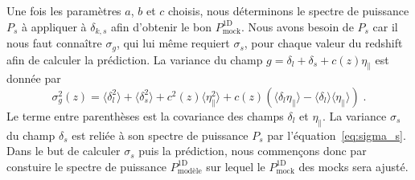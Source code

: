 Une fois les paramètres $a$, $b$ et $c$ choisis, nous déterminons le spectre de puissance $P_{s}$ à appliquer à $\delta_{k,s}$ afin d'obtenir le bon $P_{\mathrm{mock}}^{\mathrm{1D}}$.
Nous avons besoin de $P_{s}$ car il nous faut connaître $\sigma_g$, qui lui même requiert $\sigma_s$, pour chaque valeur du redshift afin de calculer la prédiction.
La variance du champ $g = \delta_l + \delta_s + c(z)\eta_{\parallel}$ est donnée par
\begin{equation}
  \label{eq:sigma_g}
  \sigma_g^2(z) = \langle \delta_l^2 \rangle + \langle \delta_s^2 \rangle + c^2(z) \langle \eta_{\parallel}^2 \rangle +
  c(z) \left( \langle \delta_l \eta_{\parallel} \rangle - \langle \delta_l \rangle \langle \eta_{\parallel} \rangle \right)\; .
\end{equation}
Le terme entre parenthèses est la covariance des champs $\delta_l$ et $\eta_{\parallel}$.
La variance $\sigma_s$ du champ $\delta_s$ est reliée à son spectre de puissance $P_{s}$ par l'équation~\ref{eq:sigma_s}.
Dans le but de calculer $\sigma_s$ puis la prédiction,
nous commençons donc par constuire le spectre de puissance $P^{\mathrm{1D}}_{\mathrm{modèle}}$ sur lequel le $P_{\mathrm{mock}}^{\mathrm{1D}}$ des mocks sera ajusté.
